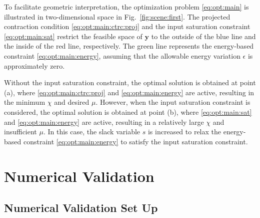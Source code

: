 \documentclass{ifacconf}
\newcommand*{\mv}[1]{\boldsymbol{#1}} %
\begin{document}
To facilitate geometric interpretation, the optimization problem \eqref{eq:opt:main} is illustrated in two-dimensional space in Fig.~\ref{fig:scene:first}.
The projected contraction condition \eqref{eq:opt:main:ctrc:proj} and the input saturation constraint \eqref{eq:opt:main:sat} restrict the feasible space of $\mv{y}$ to the outside of the blue line and the inside of the red line, respectively.
The green line represents the energy-based constraint \eqref{eq:opt:main:energy}, assuming that the allowable energy variation $\epsilon$ is approximately zero.

Without the input saturation constraint, the optimal solution is obtained at point (a), where \eqref{eq:opt:main:ctrc:proj} and \eqref{eq:opt:main:energy} are active, resulting in the minimum $\chi$ and desired $\mu$.
However, when the input saturation constraint is considered, the optimal solution is obtained at point (b), where \eqref{eq:opt:main:sat} and \eqref{eq:opt:main:energy} are active, resulting in a relatively large $\chi$ and insufficient $\mu$.
In this case, the slack variable $s$ is increased to relax the energy-based constraint \eqref{eq:opt:main:energy} to satisfy the input saturation constraint.

\section{Numerical Validation} \label{sec:validation}

\subsection{Numerical Validation Set Up}
\end{document}
